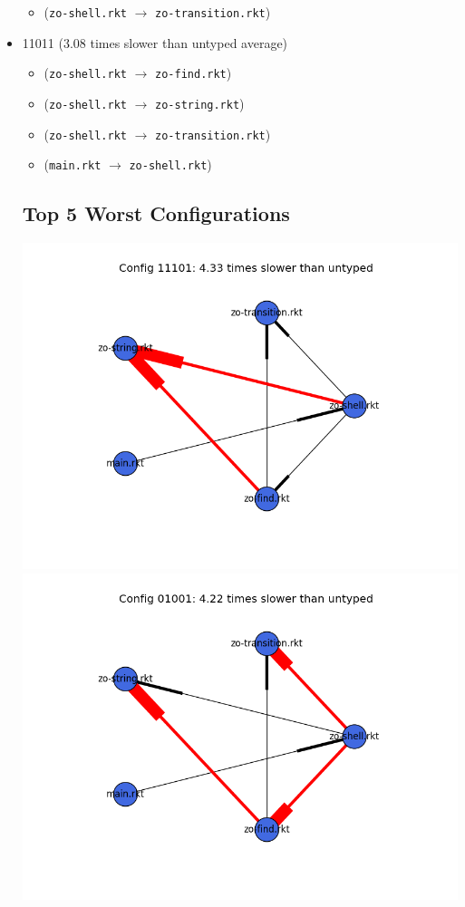 \documentclass{article}
\newcommand{\mono}[1]{\texttt{#1}}
\begin{document}
\begin{itemize}
\begin{itemize}
  \item (\mono{zo-shell.rkt} $\rightarrow$ \mono{zo-transition.rkt})
  \end{itemize}
\item 11011 (3.08 times slower than untyped average)
  \begin{itemize}
  \item (\mono{zo-shell.rkt} $\rightarrow$ \mono{zo-find.rkt})
  \item (\mono{zo-shell.rkt} $\rightarrow$ \mono{zo-string.rkt})
  \item (\mono{zo-shell.rkt} $\rightarrow$ \mono{zo-transition.rkt})
  \item (\mono{main.rkt} $\rightarrow$ \mono{zo-shell.rkt})
  \end{itemize}

\subsection{Top 5 Worst Configurations}
\includegraphics[width=\textwidth]{zordoz-2015-04-09-module-graph-11101.png}
\includegraphics[width=\textwidth]{zordoz-2015-04-09-module-graph-01001.png}

\end{itemize}
\end{document}

